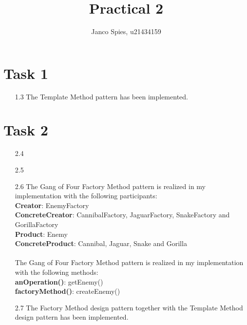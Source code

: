 \documentclass{article}
\begin{document}
\title{Practical 2}
\author{Janco Spies, u21434159}
\maketitle
\section*{Task 1}
\begin{itemize}
    \item[1.3] The Template Method pattern has been implemented.
\end{itemize}

\section*{Task 2}
\begin{itemize}
    \item[2.4] 
    \item[2.5] 
    \item[2.6] The Gang of Four Factory Method pattern is realized in my implementation with the following participants:\\
        \textbf{Creator}: EnemyFactory\\
        \textbf{ConcreteCreator}: CannibalFactory, JaguarFactory, SnakeFactory and GorillaFactory\\
        \textbf{Product}: Enemy\\
        \textbf{ConcreteProduct}: Cannibal, Jaguar, Snake and Gorilla\\~\\
        The Gang of Four Factory Method pattern is realized in my implementation with the following methods:\\
        \textbf{anOperation()}: getEnemy()\\
        \textbf{factoryMethod()}: createEnemy()\\
    \item[2.7] The Factory Method design pattern together with the Template Method design pattern has been implemented.  
\end{itemize}
\end{document}
